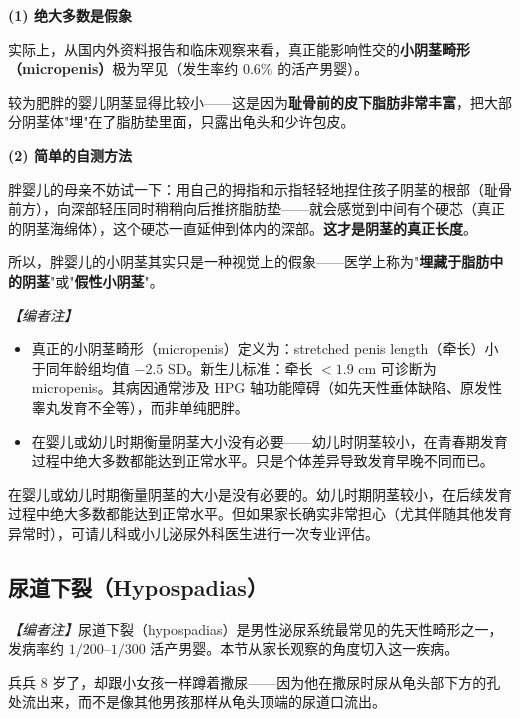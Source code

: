 \documentclass[12pt,a4paper,twoside]{ctexbook}
\begin{document}
\vspace{0.5em}
\noindent\textbf{(1) 绝大多数是假象}

实际上，从国内外资料报告和临床观察来看，真正能影响性交的\textbf{小阴茎畸形（micropenis）}极为罕见（发生率约 $0.6\%$ 的活产男婴）。

较为肥胖的婴儿阴茎显得比较小——这是因为\textbf{耻骨前的皮下脂肪非常丰富}，把大部分阴茎体"埋"在了脂肪垫里面，只露出龟头和少许包皮。

\vspace{0.3em}
\noindent\textbf{(2) 简单的自测方法}

胖婴儿的母亲不妨试一下：用自己的拇指和示指轻轻地捏住孩子阴茎的根部（耻骨前方），向深部轻压同时稍稍向后推挤脂肪垫——就会感觉到中间有个硬芯（真正的阴茎海绵体），这个硬芯一直延伸到体内的深部。\textbf{这才是阴茎的真正长度}。

所以，胖婴儿的小阴茎其实只是一种视觉上的假象——医学上称为"\textbf{埋藏于脂肪中的阴茎}"或"\textbf{假性小阴茎}"。

\vspace{0.3em}
\noindent\textit{【编者注】}
\begin{itemize}
	\item 真正的小阴茎畸形（micropenis）定义为：stretched penis length（牵长）小于同年龄组均值 $-2.5$ SD。新生儿标准：牵长 $< 1.9$ cm 可诊断为 micropenis。其病因通常涉及 HPG 轴功能障碍（如先天性垂体缺陷、原发性睾丸发育不全等），而非单纯肥胖。
	\item 在婴儿或幼儿时期衡量阴茎大小没有必要——幼儿时阴茎较小，在青春期发育过程中绝大多数都能达到正常水平。只是个体差异导致发育早晚不同而已。
\end{itemize}

\begin{tcolorbox}[colback=pink!5!white,colframe=red!50!black,title=贴心小叮咛]
在婴儿或幼儿时期衡量阴茎的大小是没有必要的。幼儿时期阴茎较小，在后续发育过程中绝大多数都能达到正常水平。但如果家长确实非常担心（尤其伴随其他发育异常时），可请儿科或小儿泌尿外科医生进行一次专业评估。
\end{tcolorbox}

\subsection{尿道下裂（Hypospadias）}

\noindent\textit{【编者注】}尿道下裂（hypospadias）是男性泌尿系统最常见的先天性畸形之一，发病率约 $1/200$--$1/300$ 活产男婴。本节从家长观察的角度切入这一疾病。

\vspace{0.5em}
兵兵 $8$ 岁了，却跟小女孩一样蹲着撒尿——因为他在撒尿时尿从龟头部下方的孔处流出来，而不是像其他男孩那样从龟头顶端的尿道口流出。
\end{document}
